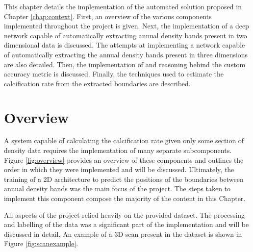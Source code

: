 This chapter details the implementation of the automated solution proposed in Chapter \ref{chap:context}. First, an overview of the various components implemented throughout the project is given. Next, the implementation of a deep network capable of automatically extracting annual density bands present in two dimensional data is discussed. The attempts at implementing a network capable of automatically extracting the annual density bands present in three dimensions are also detailed. Then, the implementation of and reasoning behind the custom accuracy metric is discussed. Finally, the techniques used to estimate the calcification rate from the extracted boundaries are described.

\section{Overview}

A system capable of calculating the calcification rate given only some section of density data requires the implementation of many separate subcomponents. Figure \ref{fig:overview} provides an overview of these components and outlines the order in which they were implemented and will be discussed. Ultimately, the training of a 2D architecture to predict the positions of the boundaries between annual density bands was the main focus of the project. The steps taken to implement this component compose the majority of the content in this Chapter.

All aspects of the project relied heavily on the provided dataset. The processing and labelling of the data was a significant part of the implementation and will be discussed in detail. An example of a 3D scan present in the dataset is shown in Figure \ref{fig:scanexample}.

